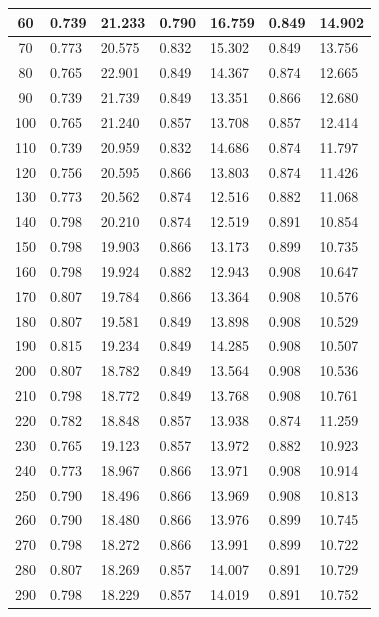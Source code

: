 \begin{longtable}{|c|l|l|l|l|l|l|}
        60 & 0.739 & 21.233 & 0.790 & 16.759 & 0.849 & 14.902 \\ \hline
        70 & 0.773 & 20.575 & 0.832 & 15.302 & 0.849 & 13.756 \\ \hline
        80 & 0.765 & 22.901 & 0.849 & 14.367 & 0.874 & 12.665 \\ \hline
        90 & 0.739 & 21.739 & 0.849 & 13.351 & 0.866 & 12.680 \\ \hline
        100 & 0.765 & 21.240 & 0.857 & 13.708 & 0.857 & 12.414 \\ \hline
        110 & 0.739 & 20.959 & 0.832 & 14.686 & 0.874 & 11.797 \\ \hline
        120 & 0.756 & 20.595 & 0.866 & 13.803 & 0.874 & 11.426 \\ \hline
        130 & 0.773 & 20.562 & 0.874 & 12.516 & 0.882 & 11.068 \\ \hline
        140 & 0.798 & 20.210 & 0.874 & 12.519 & 0.891 & 10.854 \\ \hline
        150 & 0.798 & 19.903 & 0.866 & 13.173 & 0.899 & 10.735 \\ \hline
        160 & 0.798 & 19.924 & 0.882 & 12.943 & 0.908 & 10.647 \\ \hline
        170 & 0.807 & 19.784 & 0.866 & 13.364 & 0.908 & 10.576 \\ \hline
        180 & 0.807 & 19.581 & 0.849 & 13.898 & 0.908 & 10.529 \\ \hline
        190 & 0.815 & 19.234 & 0.849 & 14.285 & 0.908 & 10.507 \\ \hline
        200 & 0.807 & 18.782 & 0.849 & 13.564 & 0.908 & 10.536 \\ \hline
        210 & 0.798 & 18.772 & 0.849 & 13.768 & 0.908 & 10.761 \\ \hline
        220 & 0.782 & 18.848 & 0.857 & 13.938 & 0.874 & 11.259 \\ \hline
        230 & 0.765 & 19.123 & 0.857 & 13.972 & 0.882 & 10.923 \\ \hline
        240 & 0.773 & 18.967 & 0.866 & 13.971 & 0.908 & 10.914 \\ \hline
        250 & 0.790 & 18.496 & 0.866 & 13.969 & 0.908 & 10.813 \\ \hline
        260 & 0.790 & 18.480 & 0.866 & 13.976 & 0.899 & 10.745 \\ \hline
        270 & 0.798 & 18.272 & 0.866 & 13.991 & 0.899 & 10.722 \\ \hline
        280 & 0.807 & 18.269 & 0.857 & 14.007 & 0.891 & 10.729 \\ \hline
        290 & 0.798 & 18.229 & 0.857 & 14.019 & 0.891 & 10.752 \\ \hline

\end{longtable}
